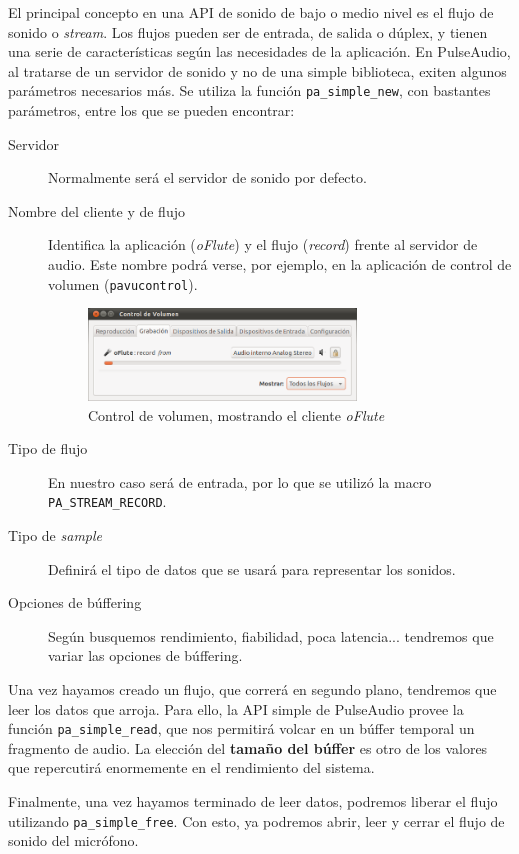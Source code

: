 El principal concepto en una API de sonido de bajo o medio nivel es el flujo de
sonido o \textit{stream}. Los flujos pueden ser de entrada, de salida o dúplex,
y tienen una serie de características según las necesidades de la aplicación. En
PulseAudio, al tratarse de un servidor de sonido y no de una simple biblioteca,
exiten algunos parámetros necesarios más. Se utiliza la función
\texttt{pa\_simple\_new}, con bastantes parámetros, entre los que se pueden
encontrar:
\begin{description}
\item[Servidor] Normalmente será el servidor de sonido por defecto.
\item[Nombre del cliente y de flujo] Identifica la aplicación (\textit{oFlute})
  y el flujo (\textit{record}) frente al servidor de audio. Este nombre podrá
  verse, por ejemplo, en la aplicación de control de volumen
  (\texttt{pavucontrol}).
  \begin{figure}[ht!]
    \centering
    \includegraphics[width=0.7\textwidth]{6_implementacion/imagen_pavucontrol}
    \caption{Control de volumen, mostrando el cliente \textit{oFlute}}
  \end{figure}
\item[Tipo de flujo] En nuestro caso será de entrada, por lo que se utilizó la
  macro \nohyphens{\texttt{PA\_STREAM\_RECORD}}.
\item[Tipo de \textit{sample}] Definirá el tipo de datos que se usará para
  representar los sonidos.
\item[Opciones de búffering] Según busquemos rendimiento, fiabilidad, poca
  latencia... tendremos que variar las opciones de búffering.
\end{description}

Una vez hayamos creado un flujo, que correrá en segundo plano, tendremos que
leer los datos que arroja. Para ello, la API simple de PulseAudio provee la
función \texttt{pa\_simple\_read}, que nos permitirá volcar en un búffer
temporal un fragmento de audio. La elección del \textbf{tamaño del búffer} es
otro de los valores que repercutirá enormemente en el rendimiento del sistema.

Finalmente, una vez hayamos terminado de leer datos, podremos liberar el flujo
utilizando \texttt{pa\_simple\_free}. Con esto, ya podremos abrir, leer y cerrar
el flujo de sonido del micrófono. 

